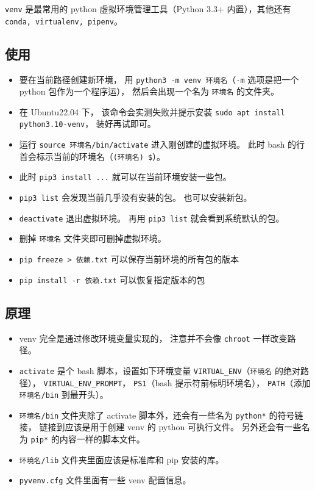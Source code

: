 

\verb`venv` 是最常用的 python 虚拟环境管理工具（Python 3.3+ 内置），其他还有 \verb`conda, virtualenv, pipenv`。

\subsection{使用}
\begin{itemize}
\item 要在当前路径创建新环境， 用 \verb`python3 -m venv 环境名`（\verb`-m` 选项是把一个 python 包作为一个程序运）， 然后会出现一个名为 \verb`环境名` 的文件夹。
\item 在 Ubuntu22.04 下， 该命令会实测失败并提示安装 \verb`sudo apt install python3.10-venv`， 装好再试即可。
\item 运行 \verb`source 环境名/bin/activate` 进入刚创建的虚拟环境。 此时 bash 的行首会标示当前的环境名（\verb`(环境名) $`）。
\item 此时 \verb`pip3 install ...` 就可以在当前环境安装一些包。
\item \verb`pip3 list` 会发现当前几乎没有安装的包。 也可以安装新包。
\item \verb`deactivate` 退出虚拟环境。 再用 \verb`pip3 list` 就会看到系统默认的包。
\item 删掉 \verb`环境名` 文件夹即可删掉虚拟环境。
\item \verb`pip freeze > 依赖.txt` 可以保存当前环境的所有包的版本
\item \verb`pip install -r 依赖.txt` 可以恢复指定版本的包
\end{itemize}

\subsection{原理}
\begin{itemize}
\item venv 完全是通过修改环境变量实现的， 注意并不会像 \verb`chroot` 一样改变路径。
\item \verb`activate` 是个 bash 脚本，设置如下环境变量 \verb`VIRTUAL_ENV`（\verb`环境名` 的绝对路径）， \verb`VIRTUAL_ENV_PROMPT`， \verb`PS1`（bash 提示符前标明环境名）， \verb`PATH`（添加 \verb`环境名/bin` 到最开头）。
\item \verb`环境名/bin` 文件夹除了 activate 脚本外，还会有一些名为 \verb`python*` 的符号链接， 链接到应该是用于创建 venv 的 python 可执行文件。 另外还会有一些名为 \verb`pip*` 的内容一样的脚本文件。
\item \verb`环境名/lib` 文件夹里面应该是标准库和 pip 安装的库。
\item \verb`pyvenv.cfg` 文件里面有一些 venv 配置信息。
\end{itemize}

